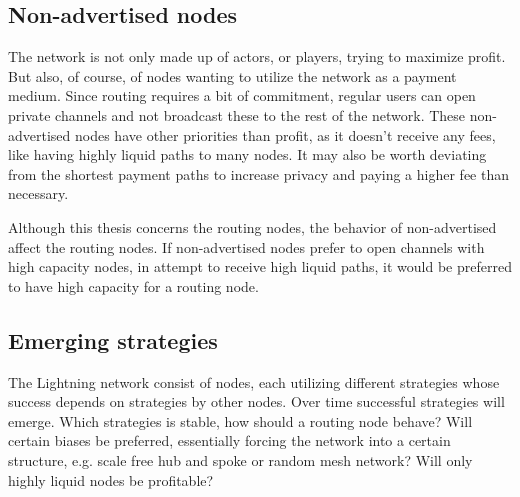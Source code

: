 \subsection{Non-advertised nodes}

The network is not only made up of actors, or players, trying to maximize profit. But also, of course, of nodes wanting to utilize the network as a payment medium. Since routing requires a bit of commitment, regular users can open private channels and not broadcast these to the rest of the network. These non-advertised nodes have other priorities than profit, as it doesn't receive any fees, like having highly liquid paths to many nodes. It may also be worth deviating from the shortest payment paths to increase privacy and paying a higher fee than necessary.

Although this thesis concerns the routing nodes, the behavior of non-advertised affect the routing nodes. If non-advertised nodes prefer to open channels with high capacity nodes, in attempt to receive high liquid paths, it would be preferred to have high capacity for a routing node.  

\subsection{Emerging strategies}

The Lightning network consist of nodes, each utilizing different strategies whose success depends on strategies by other nodes. Over time successful strategies will emerge. Which strategies is stable, how should a routing node behave? Will certain biases be preferred, essentially forcing the network into a certain structure, e.g. scale free hub and spoke or random mesh network? Will only highly liquid nodes be profitable?

\newpage
\onecolumn

